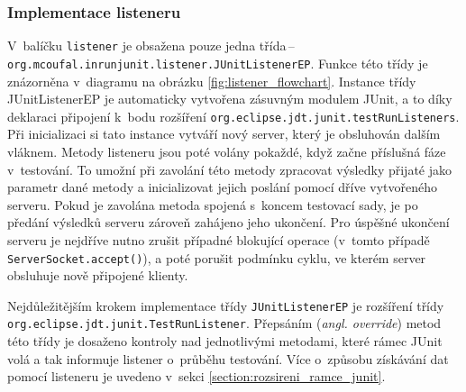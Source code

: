       \subsubsection{Implementace listeneru}
	V~balíčku \texttt{listener} je obsažena pouze jedna třída\,--\,\texttt{org.mcoufal.in\-run\-ju\-nit.lis\-ten\-er.JU\-nit\-Lis\-tenerEP}. Funkce této třídy je znázorněna v~diagramu na obrázku \ref{fig:listener_flowchart}. Instance třídy JUnitListenerEP je automaticky vytvořena zásuvným modulem JUnit, a to díky deklaraci připojení k~bodu rozšíření \texttt{org.\-eclipse.\-jdt.\-junit.\-testRunListeners}. Při inicializaci si tato instance vytváří nový server, který je obsluhován dalším vláknem. Metody listeneru jsou poté volány pokaždé, když začne příslušná fáze v~testování. To umožní při zavolání této metody zpracovat výsledky přijaté jako parametr dané metody a inicializovat jejich poslání pomocí dříve vytvořeného serveru. Pokud je zavolána metoda spojená s~koncem testovací sady, je po předání výsledků serveru zároveň zahájeno jeho ukončení. Pro úspěšné ukončení serveru je nejdříve nutno zrušit případné blokující operace (v~tomto případě \texttt{ServerSocket.accept()}), a poté porušit podmínku cyklu, ve kterém server obsluhuje nově připojené klienty.
	
	Nejdůležitějším krokem implementace třídy \texttt{JUnitListenerEP} je rozšíření třídy \texttt{org.ecli\-pse.jdt.ju\-nit.Test\-Run\-Lis\-ten\-er}. Přepsáním (\emph{angl. override}) metod této třídy je dosaženo kontroly nad jednotlivými metodami, které rámec JUnit volá a tak informuje listener o~průběhu testování. Více o~způsobu získávání dat pomocí listeneru je uvedeno v~sekci \ref{section:rozsireni_ramce_junit}.
	
